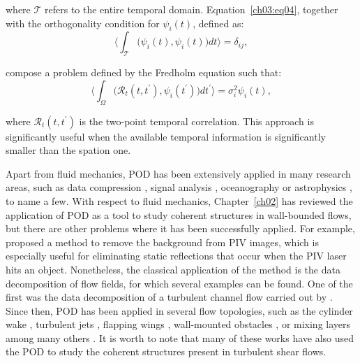 \noindent where $\mathcal{T}$ refers to the entire temporal domain.
Equation~\ref{ch03:eq04}, together with the orthogonality condition for $\psi_i(t)$, defined as:
\begin{equation}
  \biggl\langle\int_{\mathcal{T}} \bigl(\psi_i(t), \psi_i(t)\bigl)dt\biggl\rangle=\delta_{ij},
  \label{ch03:eq06}
\end{equation}

\noindent compose a problem defined by the Fredholm equation such that:
\begin{equation}
  \biggl\langle\int_{\Omega} \bigl(\mathcal{R}_t(t,t^{\prime}), \psi_i(t^{\prime})\bigl)dt^{\prime}\biggl\rangle=\sigma_i^2\psi_i(t),
  \label{ch03:eq07}
\end{equation}

\noindent where $\mathcal{R}_t(t,t^{\prime})$ is the two-point temporal correlation.
This approach is significantly useful when the available temporal information is significantly smaller than the spation one.

Apart from fluid mechanics, POD has been extensively applied in many research areas, such as data compression \citep{andrews1967adaptive}, signal analysis \citep{algazi1969optimality}, oceanography \citep{preisendorfer1988principal} or astrophysics \citep{soummer2012detection}, to name a few.
With respect to fluid mechanics, Chapter~\ref{ch02} has reviewed the application of POD as a tool to study coherent structures in wall-bounded flows, but there are other problems where it has been successfully applied.
For example, \citet{mendez2017pod} proposed a method to remove the background from PIV images, which is especially useful for eliminating static reflections that occur when the PIV laser hits an object.
Nonetheless, the classical application of the method is the data decomposition of flow fields, for which several examples can be found.
One of the first was the data decomposition of a turbulent channel flow carried out by \citet{moin1989characteristic}.
Since then, POD has been applied in several flow topologies, such as the cylinder wake \citep{deane1991low,feng2011proper,raiola2016wake}, turbulent jets \citep{glauser1991dynamics,berry2017application,mendez2019multi}, flapping wings \citep{liang2015symmetry,troshin2018modeling,raiola2021data}, wall-mounted obstacles \citep{mallor2018wall,mallor2019modal,guemes2019flow}, or mixing layers \citep{delville1999examination,citriniti2000reconstruction,kaiser2014cluster} among many others \citep{rowley2017model}.
It is worth to note that many of these works have also used the POD to study the coherent structures present in turbulent shear flows.

